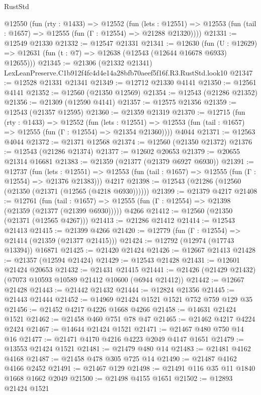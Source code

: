 \begin{lexlean}{RustStd}
\begin{coremodule}
  @12550
    (fun (rty : @1433) =>
    @12552
      (fun (lets : @12551) =>
      @12553 (fun (tail : @1657) => @12555 (fun (Γ : @12554) => @21288 @21320))))
@21331 := @12549 @21330
@21332 := @12547 @21331
@21341 := @12630
    (fun (U : @12629) => @12631 (fun (t : @7) => @12638 (@12543 (@12644 @16678 @6933) @12655)))
@21345 := @21306 (@21332 @21341) LexLeanPreserve.C1b912f4fc4d4e14a28bfb70aeef5f16f.R3.RustStd.look10
@21347 := @12528 @21331 @21341
@21349 := @12712 @21330 @4141
@21350 := @12561 @4141
@21352 := @12560 (@21350 @12569)
@21354 := @12543 (@21286 @21352)
@21356 := @21309 (@12590 @4141)
@21357 := @12575 @21356
@21359 := @12543 (@21357 @12595)
@21360 := @21359 @21319
@21370 := @12715
    (fun (rty : @1433) =>
    @12552
      (fun (lets : @12551) =>
      @12553 (fun (tail : @1657) => @12555 (fun (Γ : @12554) => @21354 @21360))))
    @4044
@21371 := @12563 @4044
@21372 := @21371 @12568
@21374 := @12560 (@21350 @21372)
@21376 := @12543 (@21286 @21374)
@21377 := @12602 @20653
@21379 := @20655 @21314 @16681
@21383 := @21359 (@21377 (@21379 @6927 @6930))
@21391 := @12737
    (fun (lets : @12551) =>
    @12553 (fun (tail : @1657) => @12555 (fun (Γ : @12554) => @21376 @21383)))
    @4217
@21398 := @12543 (@21286 (@12560 (@21350 (@21371 (@12565 (@4218 @6930))))))
@21399 := @21379 @4217
@21408 := @12761
    (fun (tail : @1657) => @12555 (fun (Γ : @12554) => @21398 (@21359 (@21377 (@21399 @6930)))))
    @4266
@21412 := @12560 (@21350 (@21371 (@12565 @4267)))
@21413 := @21286 @21412
@21414 := @12543 @21413
@21415 := @21399 @4266
@21420 := @12779 (fun (Γ : @12554) => @21414 (@21359 (@21377 @21415)))
@21424 := @12792 (@12974 (@17743 @13394)) @16871
@21425 := @21420 @21424
@21426 := @12667 @21413
@21428 := @21357 (@12594 @21424)
@21429 := @12543 @21428
@21431 := @12601 @21424 @20653
@21432 := @21431 @21415
@21441 := @21426 (@21429 @21432) (@7073 @10593 @10589 @21412 @10600 (@6944 @21412))
@21442 := @12667 @21428
@21443 := @21442 @21432
@21444 := @12824 @21356
@21445 := @21443 @21444
@21452 := @14969 @21424 @1521 @1521 @752 @759 @129 @35
@21456 := @21452 @4217 @4226 @1668 @4266
@21458 := @14631 @21424 @1521
@21462 := @21458 @460 @751 @78 @47
@21465 := @21462 @4217 @4224 @2424
@21467 := @14644 @21424 @1521
@21471 := @21467 @480 @750 @14 @16
@21477 := @21471 @4170 @4216 @4223 @2049 @4147 @1651
@21479 := @13553 @21424 @1521
@21481 := @21479 @480 @14
@21483 := @21481 @4162 @4168
@21487 := @21458 @478 @305 @725 @14
@21490 := @21487 @4162 @4166 @2452
@21491 := @21467 @129
@21498 := @21491 @116 @35 @11 @1840 @1668 @1662 @2049
@21500 := @21498 @4155 @1651
@21502 := @12893 @21424 @1521

\end{coremodule}
\end{lexlean}
